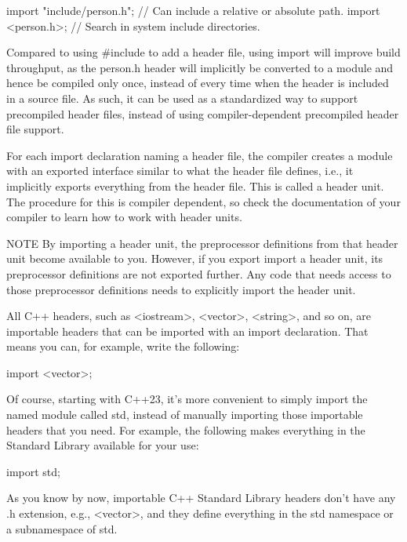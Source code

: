 \begin{cpp}
import "include/person.h"; // Can include a relative or absolute path.
import <person.h>; // Search in system include directories.
\end{cpp}

Compared to using \#include to add a header file, using import will improve build throughput, as the person.h header will implicitly be converted to a module and hence be compiled only once, instead of every time when the header is included in a source file. As such, it can be used as a standardized way to support precompiled header files, instead of using compiler-dependent precompiled header file support.

For each import declaration naming a header file, the compiler creates a module with an exported interface similar to what the header file defines, i.e., it implicitly exports everything from the header file. This is called a header unit. The procedure for this is compiler dependent, so check the documentation of your compiler to learn how to work with header units.

\begin{myNotic}{NOTE}
By importing a header unit, the preprocessor definitions from that header unit become available to you. However, if you export import a header unit, its preprocessor definitions are not exported further. Any code that needs access to those preprocessor definitions needs to explicitly import the header unit.
\end{myNotic}


All C++ headers, such as <iostream>, <vector>, <string>, and so on, are importable headers that can be imported with an import declaration. That means you can, for example, write the following:

\begin{cpp}
import <vector>;
\end{cpp}

Of course, starting with C++23, it’s more convenient to simply import the named module called std, instead of manually importing those importable headers that you need. For example, the following makes everything in the Standard Library available for your use:

\begin{cpp}
import std;
\end{cpp}

As you know by now, importable C++ Standard Library headers don’t have any .h extension, e.g., <vector>, and they define everything in the std namespace or a subnamespace of std.

